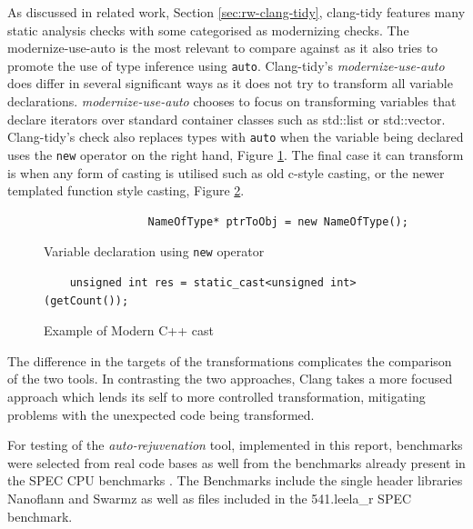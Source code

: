 \documentclass[bsc,frontabs,singlespacing,twoside,parskip,deptreport]{infthesis}
\begin{document}

As discussed in related work, Section \ref{sec:rw-clang-tidy}, clang-tidy features many static analysis checks with some categorised as modernizing checks. The modernize-use-auto \cite{CLANG_AUTO} is the most relevant to compare against as it also tries to promote the use of type inference using \texttt{auto}. Clang-tidy's \textit{modernize-use-auto} does differ in several significant ways as it does not try to transform all variable declarations. \textit{modernize-use-auto} chooses to focus on transforming variables that declare iterators over standard container classes such as std::list or std::vector. Clang-tidy's check also replaces types with \texttt{auto} when the variable being declared uses the \texttt{new} operator on the right hand, Figure \ref{fig:code-new-vardec}. The final case it can transform is when any form of casting is utilised such as old c-style casting, or the newer templated function style casting, Figure \ref{fig:code-modern-cast}.

\begin{figure}[H]
    \begin{verbatim}
                NameOfType* ptrToObj = new NameOfType(); 
    \end{verbatim}
    \caption{Variable declaration using \texttt{new} operator}
    \centering
    \label{fig:code-new-vardec}
\end{figure}

\begin{figure}[H]
    \begin{verbatim}
    unsigned int res = static_cast<unsigned int>(getCount());
    \end{verbatim}
    \caption{Example of Modern C++ cast}
    \centering
    \label{fig:code-modern-cast}
\end{figure}

The difference in the targets of the transformations complicates the comparison of the two tools. In contrasting the two approaches, Clang takes a more focused approach which lends its self to more controlled transformation, mitigating problems with the unexpected code being transformed.

For testing of the \textit{auto-rejuvenation} tool, implemented in this report, benchmarks were selected from real code bases as well from the benchmarks already present in the SPEC CPU benchmarks \cite{SPEC}. The Benchmarks include the single header libraries Nanoflann \cite{blanco2014nanoflann} and Swarmz \cite{SWARMZ} as well as files included in the 541.leela\_r \cite{SPEC_LEELA} SPEC benchmark.
\end{document}
